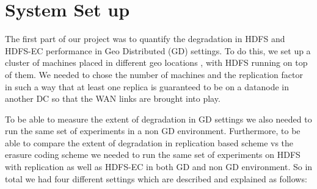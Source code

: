 \documentclass{sig-alternate-05-2015}
\begin{document}
%
%





%
%

%
%
\printccsdesc



\section{System Set up}
The first part of our project was to quantify the degradation in HDFS and HDFS-EC performance in Geo Distributed (GD) settings. To do this, we set up a cluster of machines placed in different geo locations , with HDFS running on top of them. We needed to chose the number of machines and the replication factor in such a way that at least one replica is guaranteed to be on a datanode in another DC so that the WAN links are brought into play. 

To be able to measure the extent of degradation in GD settings we also needed to run the same set of experiments in a non GD environment. Furthermore, to be able to compare the extent of degradation in replication based scheme vs the erasure coding scheme we needed to run the same set of experiments on HDFS with replication as well as HDFS-EC in both GD and non GD environment. So in total we had four different settings which are described and explained as follows:
\end{document}
